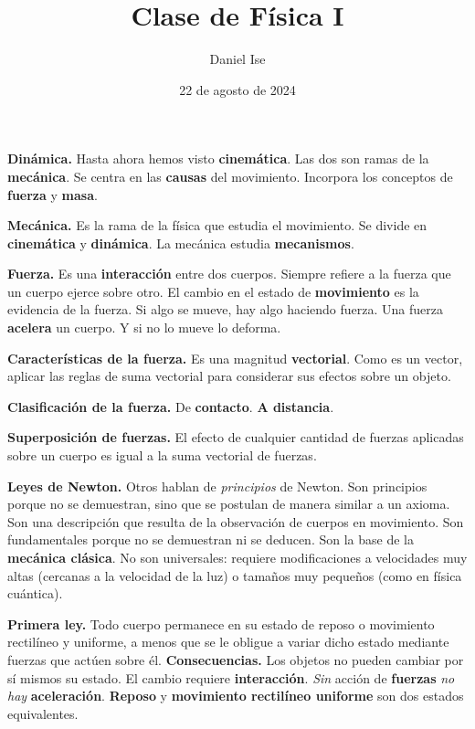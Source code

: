 \documentclass{article}
\title{Clase de Física I}
\author{Daniel Ise}
\date{22 de agosto de 2024}
\begin{document}
\maketitle

\textbf{Dinámica.} Hasta ahora hemos visto \textbf{cinemática}. Las dos son 
ramas de la \textbf{mecánica}. Se centra en las \textbf{causas} del movimiento.
Incorpora los conceptos de \textbf{fuerza} y \textbf{masa}.

\textbf{Mecánica.} Es la rama de la física que estudia el movimiento. Se divide
en \textbf{cinemática} y \textbf{dinámica}. La mecánica estudia 
\textbf{mecanismos}.

\textbf{Fuerza.} Es una \textbf{interacción} entre dos cuerpos. Siempre refiere
a la fuerza que un cuerpo ejerce sobre otro. El cambio en el estado de 
\textbf{movimiento} es la evidencia de la fuerza. Si algo se mueve, 
hay algo haciendo fuerza. Una fuerza \textbf{acelera} un cuerpo. Y si no lo 
mueve lo deforma. 

\textbf{Características de la fuerza.} Es una magnitud \textbf{vectorial}. 
Como es un vector, aplicar las reglas de suma vectorial para considerar sus
efectos sobre un objeto.

\textbf{Clasificación de la fuerza.} De \textbf{contacto}. \textbf{A distancia}.

\textbf{Superposición de fuerzas.} El efecto de cualquier cantidad de fuerzas
aplicadas sobre un cuerpo es igual a la suma vectorial de fuerzas.

\textbf{Leyes de Newton.} Otros hablan de \textit{principios} de Newton. Son 
principios porque no se demuestran, sino que se postulan de manera similar a un
axioma. Son una descripción que resulta de la observación de cuerpos en 
movimiento. Son fundamentales porque no se demuestran ni se deducen. Son la base
de la \textbf{mecánica clásica}. No son universales: requiere modificaciones a 
velocidades muy altas (cercanas a la velocidad de la luz) o tamaños muy pequeños
(como en física cuántica).

\textbf{Primera ley. } Todo cuerpo permanece en su estado de reposo o movimiento
rectilíneo y uniforme, a menos que se le obligue a variar dicho estado 
mediante fuerzas que actúen sobre él. \textbf{Consecuencias.} Los objetos no 
pueden cambiar por sí mismos su estado. El cambio requiere \textbf{interacción}.
\textit{Sin} acción de \textbf{fuerzas} \textit{no hay} \textbf{aceleración}. 
\textbf{Reposo} y \textbf{movimiento rectilíneo uniforme} son dos estados 
equivalentes. 
\end{document}
